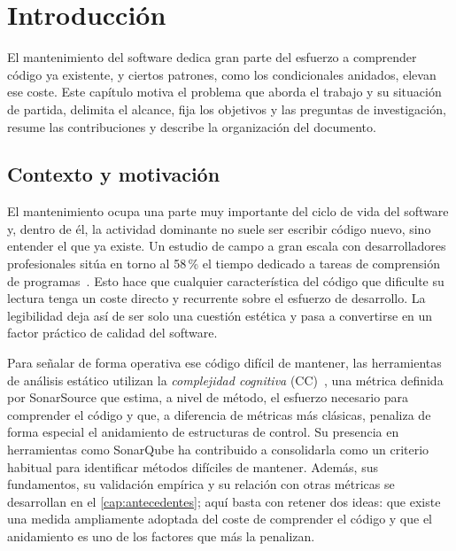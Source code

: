 \chapter{Introducción}
\label{cap:introduccion}

El mantenimiento del software dedica gran parte del esfuerzo a comprender
código ya existente, y ciertos patrones, como los condicionales anidados,
elevan ese coste. Este capítulo motiva el problema que aborda el trabajo y su
situación de partida, delimita el alcance, fija los objetivos y las preguntas
de investigación, resume las contribuciones y describe la organización del
documento.

\section{Contexto y motivación}
\label{sec:contexto}

El mantenimiento ocupa una parte muy importante del ciclo de vida del
software y, dentro de él, la actividad dominante no suele ser escribir código
nuevo, sino entender el que ya existe. Un estudio de campo a gran escala con
desarrolladores profesionales sitúa en torno al 58\,\% el tiempo dedicado a
tareas de comprensión de programas~\cite{10.1109/TSE.2017.2734091}. Esto hace
que cualquier característica del código que dificulte su lectura tenga un
coste directo y recurrente sobre el esfuerzo de desarrollo. La legibilidad
deja así de ser solo una cuestión estética y pasa a convertirse en un factor
práctico de calidad del software.

Para señalar de forma operativa ese código difícil de mantener, las
herramientas de análisis estático utilizan la \emph{complejidad
cognitiva} (CC)~\cite{10.1145/3194164.3194186}, una métrica definida por
SonarSource que estima, a nivel de método, el esfuerzo necesario para
comprender el código y que, a diferencia de métricas más clásicas, penaliza
de forma especial el anidamiento de estructuras de control. Su presencia en
herramientas como SonarQube ha contribuido a consolidarla como un criterio
habitual para identificar métodos difíciles de mantener. Además, sus
fundamentos, su validación empírica y su relación con otras métricas se
desarrollan en el \autoref{cap:antecedentes}; aquí basta con retener dos
ideas: que existe una medida ampliamente adoptada del coste de comprender el
código y que el anidamiento es uno de los factores que más la penalizan.

